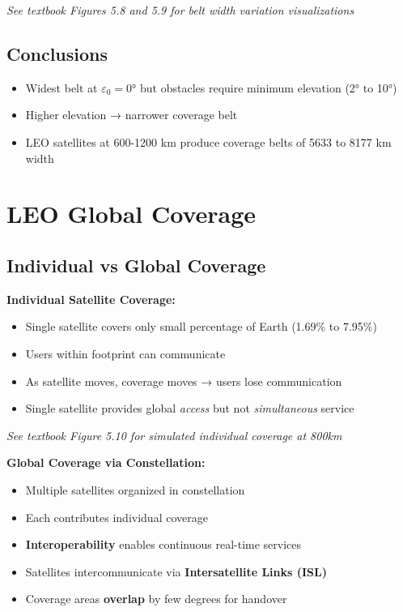 \documentclass[11pt,letterpaper]{article}
\begin{document}
\textit{See textbook Figures 5.8 and 5.9 for belt width variation visualizations}

\subsection{Conclusions}
\begin{itemize}
    \item Widest belt at $\varepsilon_0 = 0°$ but obstacles require minimum elevation (2° to 10°)
    \item Higher elevation → narrower coverage belt
    \item LEO satellites at 600-1200 km produce coverage belts of 5633 to 8177 km width
\end{itemize}

\section{LEO Global Coverage}

\subsection{Individual vs Global Coverage}

\textbf{Individual Satellite Coverage:}
\begin{itemize}
    \item Single satellite covers only small percentage of Earth (1.69\% to 7.95\%)
    \item Users within footprint can communicate
    \item As satellite moves, coverage moves → users lose communication
    \item Single satellite provides global \textit{access} but not \textit{simultaneous} service
\end{itemize}

\textit{See textbook Figure 5.10 for simulated individual coverage at 800km}

\textbf{Global Coverage via Constellation:}
\begin{itemize}
    \item Multiple satellites organized in constellation
    \item Each contributes individual coverage
    \item \textbf{Interoperability} enables continuous real-time services
    \item Satellites intercommunicate via \textbf{Intersatellite Links (ISL)}
    \item Coverage areas \textbf{overlap} by few degrees for handover
\end{itemize}
\end{document}
